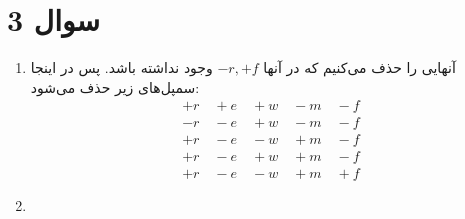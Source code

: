\section*{سوال 3}
\begin{enumerate}
    \item آنهایی را حذف می‌کنیم که در آنها
    $-r, +f$
    وجود نداشته باشد. پس در اینجا سمپل‌های زیر حذف می‌شود:
    \begin{gather*}
        +r \quad +e \quad +w \quad -m \quad -f\\
        -r \quad -e \quad +w \quad -m \quad -f\\
        +r \quad -e \quad -w \quad +m \quad -f\\
        +r \quad -e \quad +w \quad +m \quad -f\\
        +r \quad -e \quad -w \quad +m \quad +f
    \end{gather*}
    \item 
\end{enumerate}